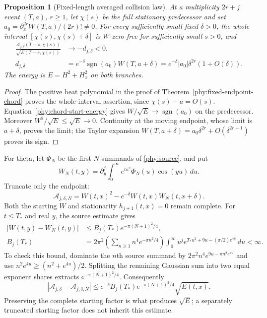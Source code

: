 \documentclass[11pt]{article}
\numberwithin{equation}{section}
\newtheorem{proposition}[theorem]{Proposition}
\theoremstyle{definition}
\theoremstyle{remark}
\begin{document}
\begin{proposition}[Fixed-length averaged collision law]
\label{obs:average-collision}
At a multiplicity $2r+j$ event $(T,a)$, $r\ge1$, let $\chi(s)$ be the full
stationary predecessor and set
$a_0=\partial_x^{2r}W(T,a)/(2r)!\ne0$.
For every sufficiently small fixed $\delta>0$, the whole interval
$[\chi(s),\chi(s)+\delta]$ is $W$-zero-free for sufficiently small
$s>0$, and
\begin{align}
 \frac{\mathcal A_{j,\delta}(T-s,\chi(s))}
 {\sqrt{E(T-s,\chi(s))}}&\longrightarrow-d_{j,\delta}<0,
 \label{obs:average-collision-limit}\\
 d_{j,\delta}
 &=e^{-\delta}\operatorname{sgn}(a_0)W(T,a+\delta)
 =e^{-\delta}|a_0|\delta^{2r}(1+O(\delta)).\nonumber
\end{align}
The energy is $E=H^2+H_x^2$ on both branches.
\end{proposition}
\begin{proof}
The positive heat polynomial in the proof of
Theorem~\ref{phy:fixed-endpoint-chord} proves the whole-interval
assertion, since $\chi(s)-a=O(s)$.
Equation~\eqref{phy:chord-start-energy} gives
$W/\sqrt E\to\operatorname{sgn}(a_0)$ on the predecessor.
Moreover $W^2/\sqrt E\le\sqrt E\to0$.
Continuity at the moving endpoint, whose limit is $a+\delta$, proves
the limit; the Taylor expansion
$W(T,a+\delta)=a_0\delta^{2r}+O(\delta^{2r+1})$ proves its sign.
\end{proof}

For theta, let $\Phi_N$ be the first $N$ summands of
\eqref{phy:source}, and put
\[
 W_N(t,y)=\partial_y^j\int_0^\infty e^{tu^2}\Phi_N(u)\cos(yu)\,du.
\]
Truncate only the endpoint:
\begin{equation}
 \mathcal A_{j,\delta,N}
 =W(t,x)^2-e^{-\delta}W(t,x)W_N(t,x+\delta).
 \label{obs:average-endpoint-cutoff}
\end{equation}
Both the starting $W$ and stationarity $h_{j+1}(t,x)=0$ remain
complete.  For $t\le T_*$ and real $y$, the source estimate gives
\begin{align}
 |W(t,y)-W_N(t,y)|
 &\le B_j(T_*)e^{-\pi(N+1)^2/4},\label{obs:average-value-tail}\\
 B_j(T_*)&=2\pi^2\left(\sum_{n\ge1}n^4e^{-\pi n^2/4}\right)
 \int_0^\infty u^j e^{T_*u^2+9u-(\pi/2)e^{4u}}\,du<\infty.
 \nonumber
\end{align}
To check this bound, dominate the $n$th source summand by
$2\pi^2n^4e^{9u-\pi n^2e^{4u}}$ and use
$n^2e^{4u}\ge(n^2+e^{4u})/2$.
Splitting the remaining Gaussian sum into two equal exponent shares
extracts $e^{-\pi(N+1)^2/4}$.
Consequently
\begin{equation}
 |\mathcal A_{j,\delta}-\mathcal A_{j,\delta,N}|
 \le e^{-\delta}B_j(T_*)e^{-\pi(N+1)^2/4}\sqrt{E(t,x)}.
 \label{obs:average-mixed-tail}
\end{equation}
Preserving the complete starting factor is what produces $\sqrt E$;
a separately truncated starting factor does not inherit this estimate.
\end{document}
